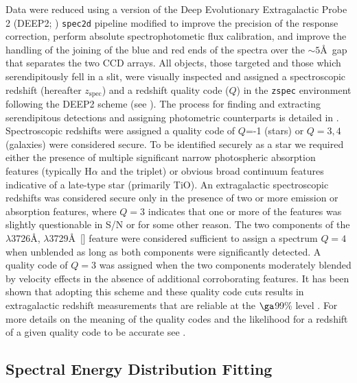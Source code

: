 \documentclass[a4paper,fleqn,usenatbib]{mnras}
\def\zspec{$z_{\mathrm{spec}}$}
\begin{document}
Data were reduced using a version of the Deep Evolutionary Extragalactic Probe 2 (DEEP2; \citealt{Davis2003, Newman2013}) \texttt{spec2d} pipeline modified
to improve the precision of the response correction, perform absolute spectrophotometic flux calibration, and improve the handling of the joining
of the blue and red ends of the spectra over the $\sim5$\AA\ gap that separates the two CCD arrays.  All objects, those targeted and those which 
serendipitously fell in a slit, were visually inspected and assigned a spectroscopic redshift (hereafter \zspec ) and a redshift quality code 
($Q$) in the \texttt{zspec} environment following the DEEP2 scheme (see \citealt{Gal2008, Newman2013}). The process for finding and extracting serendipitous 
detections and assigning photometric counterparts is detailed in \citet{Lemaux2009}. Spectroscopic redshifts were assigned a quality code of 
$Q$=-1 (stars) or $Q=3,4$ (galaxies) were considered secure. To be identified securely as a star we required either the presence of multiple significant
narrow photospheric absorption features (typically H$\alpha$ and the  triplet) or obvious broad continuum features indicative of a late-type star
(primarily TiO). An extragalactic spectroscopic redshifts was considered secure only in the presence of two or more emission or absorption features, 
where $Q=3$ indicates that one or more of the features was slightly questionable in S/N or for some other reason. The two components of the 
$\lambda$3726\AA, $\lambda$3729\AA\ [] feature were considered sufficient to assign a spectrum $Q=4$ when unblended as long as 
both components were significantly detected. A quality code of $Q=3$ was assigned when the two components moderately blended by velocity effects
in the absence of additional corroborating features. It has been shown that adopting this scheme and these quality code cuts results in 
extragalactic redshift measurements that are reliable at the $\ga$99\% level \citep{Newman2013}. For more details on the meaning of the quality 
codes and the likelihood for a redshift of a given quality code to be accurate see \citet{Newman2013}. 




\subsection{Spectral Energy Distribution Fitting}
\label{sec:sedfitting}
\end{document}
